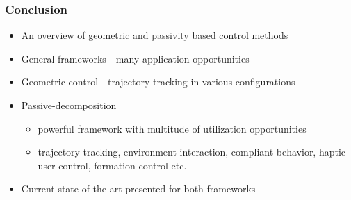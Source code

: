 \begin{frame}
	\frametitle{Conclusion}
	
	\begin{itemize}
		\item An overview of geometric and passivity based control methods
		\item General frameworks - many application opportunities
		\item Geometric control - trajectory tracking in various configurations
		\item Passive-decomposition
		\begin{itemize}
			\item powerful framework with multitude of utilization opportunities
			\item trajectory tracking, environment interaction, compliant behavior, haptic user control, formation control etc.
		\end{itemize}
		\item Current state-of-the-art presented for both frameworks
	\end{itemize}
\end{frame}